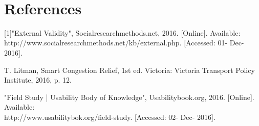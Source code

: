 \documentclass[onecolumn, draftclsnofoot,10pt, compsoc]{IEEEtran}
\begin{document}
\clearpage\
\section{References}

[1]"External Validity", Socialresearchmethods.net, 2016. [Online]. Available:\\ http://www.socialresearchmethods.net/kb/external.php. [Accessed: 01- Dec- 2016].
\par\null\par
\noindent [2]T. Litman, Smart Congestion Relief, 1st ed. Victoria: Victoria Transport Policy Institute, 2016, p. 12.
\par\null\par
\noindent [3]"Field Study | Usability Body of Knowledge", Usabilitybook.org, 2016. [Online]. Available: \\ http://www.usabilitybok.org/field-study. [Accessed: 02- Dec- 2016].
\end{document}
